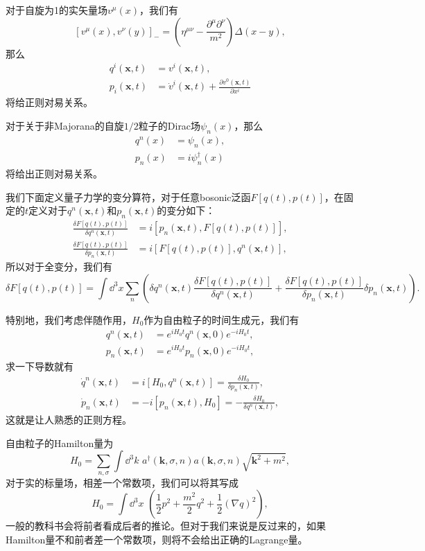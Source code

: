 \documentclass[10pt]{extbook}
\theoremstyle{plain}%
\begin{document}
对于自旋为1的实矢量场$v^\mu(x)$，我们有
\[
	[v^\mu(x),v^\nu(y)]_-=\left(\eta^{\mu\nu}-\frac{\partial^\mu\partial^\nu}{m^2}\right)\Delta(x-y),
\]
那么
\[
	\begin{split}
	q^i(\mathbf{x},t)&=v^i(\mathbf{x},t),\\
	p_i(\mathbf{x},t)&=\dot{v}^i(\mathbf{x},t)+\frac{\partial v^0(\mathbf{x},t)}{\partial x^i}
	\end{split}
\]
将给正则对易关系。

对于关于非Majorana的自旋$1/2$粒子的Dirac场$\psi_n(x)$，那么
\[
	\begin{split}
	q^n(x)&=\psi_n(x),\\
	p_n(x)&=i\psi^\dag_n(x)
	\end{split}
\]
将给出正则对易关系。

我们下面定义量子力学的变分算符，对于任意bosonic泛函$F[q(t),p(t)]$，在固定的$t$定义对于$q^n(\mathbf{x},t)$和$p_n(\mathbf{x},t)$的变分如下：
\[
	\begin{split}
	\frac{\delta F[q(t),p(t)]}{\delta q^n(\mathbf{x},t)}&=i\left[p_n(\mathbf{x},t),F[q(t),p(t)]\right],\\
	\frac{\delta F[q(t),p(t)]}{\delta p_n(\mathbf{x},t)}&=i\left[F[q(t),p(t)],q^n(\mathbf{x},t)\right],
	\end{split}
\]
所以对于全变分，我们有
\[
	\delta F[q(t),p(t)]=\int \dd^3 x\sum_n\left(\delta q^n(\mathbf{x},t)\frac{\delta F[q(t),p(t)]}{\delta q^n(\mathbf{x},t)}+\frac{\delta F[q(t),p(t)]}{\delta p_n(\mathbf{x},t)}\delta p_n(\mathbf{x},t)\right).
\]

特别地，我们考虑伴随作用，$H_0$作为自由粒子的时间生成元，我们有
\[
\begin{split}
	q^n(\mathbf{x},t)&=e^{iH_0t}q^n(\mathbf{x},0)e^{-iH_0t},\\
	p_n(\mathbf{x},t)&=e^{iH_0t}p_n(\mathbf{x},0)e^{-iH_0t},
\end{split}
\]
求一下导数就有
\[
\begin{split}
	\dot{q}^n(\mathbf{x},t)&=i[H_0,q^n(\mathbf{x},t)]=\frac{\delta H_0}{\delta p_n(\mathbf{x},t)},\\
	\dot{p}_n(\mathbf{x},t)&=-i[p_n(\mathbf{x},t),H_0]=-\frac{\delta H_0}{\delta q^n(\mathbf{x},t)},
\end{split}
\]
这就是让人熟悉的正则方程。

自由粒子的Hamilton量为
\[
	H_0=\sum_{n,\sigma}\int \dd^3 k\,\,a^\dag(\mathbf{k},\sigma,n)a(\mathbf{k},\sigma,n)\sqrt{\mathbf{k}^2+m^2},
\]
对于实的标量场，相差一个常数项，我们可以将其写成
\[
	H_0=\int \dd^3 x\,\,\left(\frac{1}{2}p^2+\frac{m^2}{2}q^2+\frac{1}{2}(\nabla q)^2\right),
\]
一般的教科书会将前者看成后者的推论。但对于我们来说是反过来的，如果Hamilton量不和前者差一个常数项，则将不会给出正确的Lagrange量。
\end{document}
